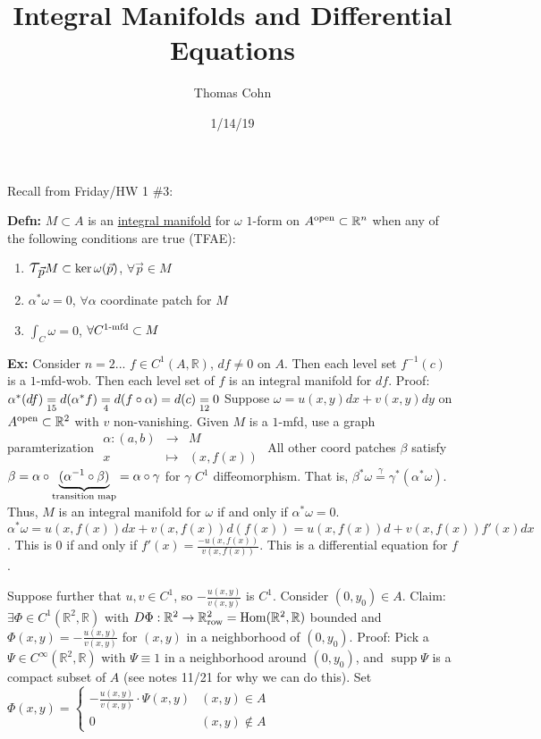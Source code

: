 \documentclass[10pt,letterpaper]{article}
\author{Thomas Cohn}
\title{Integral Manifolds and Differential Equations}
\date{1/14/19} %
\newcommand{\n}{\hfill\break}
\newcommand{\up}{\vspace{-\baselineskip}}
\newcommand{\defn}[1]{\par\noindent\settowidth{\hangindent}{\textbf{Defn: }}\textbf{Defn: }#1\n}
\newcommand{\ex}[1]{\par\noindent\settowidth{\hangindent}{\textbf{Ex: }}\textbf{Ex: }#1\n}
\newcommand{\ptxt}[1]{\textrm{\textnormal{#1}}}
\newcommand{\reals}{\mathbb{R}}
\newcommand{\R}{\reals}
\DeclareMathOperator{\Hom}{Hom}
\newcommand{\inv}{^{-1}}
\newcommand{\of}{\circ}
\newcommand{\Tau}{\mathlarger{\mathlarger{\mathlarger{\mathlarger{\tau}}}}}
\DeclareMathOperator{\supp}{supp}
\begin{document}
\maketitle
\setlength\RaggedRightParindent{\parindent}
\RaggedRight

\par\noindent Recall from Friday/HW 1 \#3:

\defn{$M\subset{}A$ is an \underline{integral manifold} for $\omega$ $1$-form on $A^{\ptxt{open}}\subset\R^{n}$ when any of the following conditions are true (TFAE):
\begin{enumerate}[label=(\alph*), leftmargin=4\parindent]
	\item $\Tau_{\vec{p}}M\subset\ker\omega(\vec{p})$, $\forall\vec{p}\in{}M$
	\item $\alpha^{*}\omega=0$, $\forall\alpha$ coordinate patch for $M$
	\item $\int_{C}\omega=0$, $\forall{}C^{\ptxt{$1$-mfd}}\subset{}M$
\end{enumerate}\up}

\ex{Consider $n=2$...\n
$f\in{}C^{1}(A,\R)$, $df\ne{}0$ on $A$.\n
Then each level set $f\inv(c)$ is a $1$-mfd-wob.\n
Then each level set of $f$ is an integral manifold for $df$.\n
Proof: $\alpha^{*}(df)\underset{\ptxt{15}}{=}d(\alpha^{*}f)\underset{\ptxt{4}}{=}d(f\of\alpha)=d(c)\underset{\ptxt{12}}=0$\n
\n
Suppose $\omega=u(x,y)dx+v(x,y)dy$ on $A^{\ptxt{open}}\subset\R^{2}$ with $v$ non-vanishing.\n
Given $M$ is a $1$-mfd, use a graph paramterization $\begin{array}{rcl}\alpha:(a,b) & \!\!\!\!\to & \!\!\!\!M\\ x & \!\!\!\!\mapsto & \!\!\!\!(x,f(x))\end{array}$\n
\n
All other coord patches $\beta$ satisfy $\beta=\alpha\of\underbrace{(\alpha\inv\of\beta)}_{\ptxt{transition map}}=\alpha\of\gamma$ for $\gamma$ $C^{1}$ diffeomorphism.\n
That is, $\beta^{*}\omega\overset{\gamma}{=}\gamma^{*}(\alpha^{*}\omega)$.\n
\n
Thus, $M$ is an integral manifold for $\omega$ if and only if $\alpha^{*}\omega=0$.\n
$\alpha^{*}\omega=u(x,f(x))dx+v(x,f(x))d(f(x))=u(x,f(x))d+v(x,f(x))f'(x)dx$.\n
This is $0$ if and only if $f'(x)=\frac{-u(x,f(x))}{v(x,f(x))}$. This is a differential equation for $f$.}

\par\noindent Suppose further that $u,v\in{}C^{1}$, so $-\frac{u(x,y)}{v(x,y)}$ is $C^{1}$. Consider $(0,y_{0})\in{}A$.\n
Claim: $\exists\Phi\in{}C^{1}(\R^{2},\R)$ with $D\Phi:\R^{2}\to\R^{2}_{\ptxt{row}}=\Hom(\R^{2},\R)$ bounded and $\Phi(x,y)=-\frac{u(x,y)}{v(x,y)}$ for $(x,y)$ in a neighborhood of $(0,y_{0})$.\n
Proof: Pick a $\Psi\in{}C^{\infty}(\R^{2},\R)$ with $\Psi\equiv{}1$ in a neighborhood around $(0,y_{0})$, and $\supp\Psi$ is a compact subset of $A$ (see notes 11/21 for why we can do this).\n
Set $\Phi(x,y)=\left\{\begin{array}{ll}-\frac{u(x,y)}{v(x,y)}\cdot\Psi(x,y) & (x,y)\in{}A\\ 0 & (x,y)\not\in{}A\end{array}\right.$\n
\end{document}
